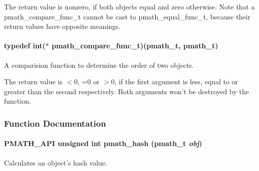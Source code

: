 The return value is nonzero, if both objects equal and zero otherwise. Note that a pmath\_\-compare\_\-func\_\-t cannot be cast to pmath\_\-equal\_\-func\_\-t, because their return values have opposite meanings. \hypertarget{group__objects_g9180e6d1f4ba84b77ea71414ce57677f}{
\paragraph[{pmath\_\-compare\_\-func\_\-t}]{\setlength{\rightskip}{0pt plus 5cm}typedef int($\ast$ {\bf pmath\_\-compare\_\-func\_\-t})({\bf pmath\_\-t}, {\bf pmath\_\-t})}\hfill}
\label{group__objects_g9180e6d1f4ba84b77ea71414ce57677f}


A comparision function to determine the order of two objects. 

The return value is $<$0, =0 or $>$0, if the first argument is less, equal to or greater than the second respectively. Both arguments won't be destroyed by the function. 

\subsubsection{Function Documentation}
\hypertarget{group__objects_g9413cfb0b3fd00d361046189853a11d8}{
\paragraph[{pmath\_\-hash}]{\setlength{\rightskip}{0pt plus 5cm}PMATH\_\-API unsigned int pmath\_\-hash ({\bf pmath\_\-t} {\em obj})}\hfill}
\label{group__objects_g9413cfb0b3fd00d361046189853a11d8}


Calculates an object's hash value. 

